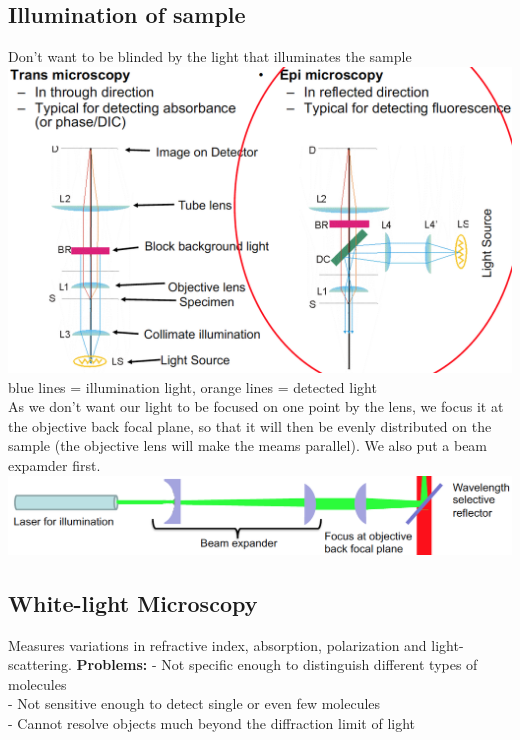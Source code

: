 \documentclass[9pt]{article}
\begin{document}
\begin{multicols}{2}
\subsection{Illumination of sample}
Don't want to be blinded by the light that illuminates the sample
\includegraphics[scale=0.2]{Images/illumination_of_sample.png} blue lines = illumination light, orange lines = detected light\\
As we don't want our light to be focused on one point by the lens, we focus it at the objective back focal plane, so that it will then be evenly distributed on the sample (the objective lens will make the meams parallel). We also put a beam expamder first.\\
\includegraphics[scale=0.2]{Images/lightbeam_adaptations.png}
\subsection{White-light Microscopy}
Measures variations in refractive index, absorption, polarization and light-scattering. 
\textbf{Problems:} - Not specific enough to distinguish different types of molecules\\
- Not sensitive enough to detect single or even few molecules\\
- Cannot resolve objects much beyond the diffraction limit of light

\end{multicols}
\end{document}
